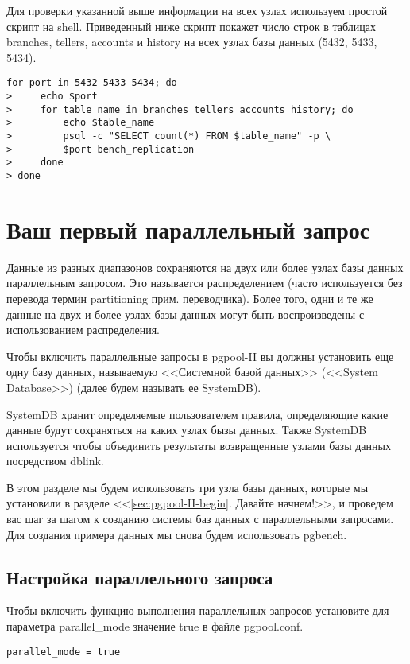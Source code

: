 Для проверки указанной выше информации на всех узлах используем простой скрипт на shell. 
Приведенный ниже скрипт покажет число строк в таблицах branches, tellers, accounts и history 
на всех узлах базы данных (5432, 5433, 5434).
\begin{lstlisting}[label=lst:pgpool21,caption=Проверка репликации]
for port in 5432 5433 5434; do
>     echo $port
>     for table_name in branches tellers accounts history; do
>         echo $table_name
>         psql -c "SELECT count(*) FROM $table_name" -p \
>         $port bench_replication
>     done
> done
\end{lstlisting}


\section{Ваш первый параллельный запрос}
Данные из разных диапазонов сохраняются на двух или более узлах базы данных параллельным запросом. 
Это называется распределением (часто используется без перевода термин partitioning прим. переводчика). 
Более того, одни и те же данные на двух и более узлах базы данных могут быть воспроизведены с использованием распределения.

Чтобы включить параллельные запросы в pgpool-II вы должны установить еще одну базу данных, называемую 
<<Системной базой данных>> (<<System Database>>) (далее будем называть ее SystemDB).

SystemDB хранит определяемые пользователем правила, определяющие какие данные будут сохраняться на каких узлах бызы данных. 
Также SystemDB используется чтобы объединить результаты возвращенные узлами базы данных посредством dblink.

В этом разделе мы будем использовать три узла базы данных, которые мы установили в разделе <<\ref{sec:pgpool-II-begin}. 
Давайте начнем!>>, и проведем вас шаг за шагом к созданию системы баз данных с параллельными запросами. 
Для создания примера данных мы снова будем использовать pgbench.

\subsection{Настройка параллельного запроса}
Чтобы включить функцию выполнения параллельных запросов установите для параметра parallel\_mode значение true в файле pgpool.conf.
\begin{lstlisting}[label=lst:pgpool22,caption=Настройка параллельного запроса]
parallel_mode = true
\end{lstlisting}

